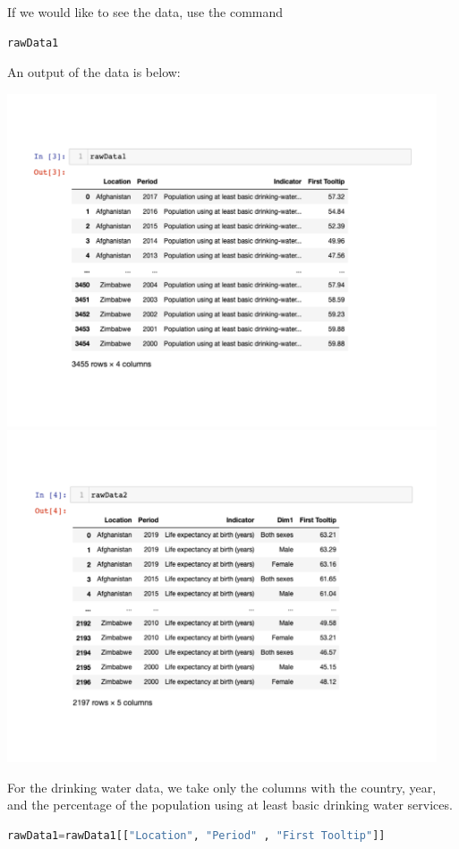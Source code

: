 \documentclass[12pt]{article}
\begin{document}
\noindent
If we would like to see the data, use the command
\begin{lstlisting}[language=Python]
rawData1
\end{lstlisting}

\noindent
An output of the data is below:

\begin{center}
\includegraphics[width=5in]{Figures/data1.pdf}
\includegraphics[width=5in]{Figures/data2.pdf}
\end{center}

\noindent
For the drinking water data, we take only the columns with the country, year, and the percentage of the population using at least basic drinking water services.
\begin{lstlisting}[language=Python]
rawData1=rawData1[["Location", "Period" , "First Tooltip"]]
\end{lstlisting}
\end{document}
